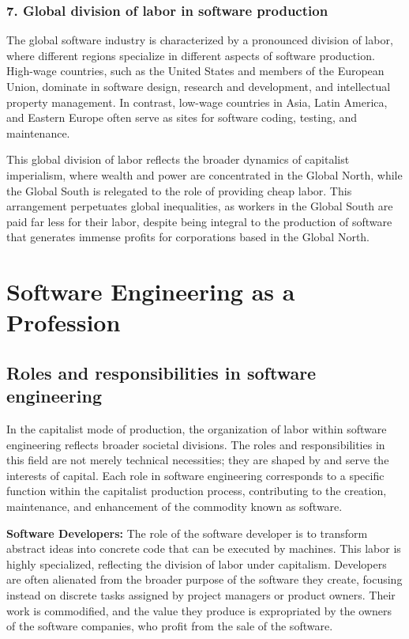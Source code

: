 \begin{refsection}
\begin{multicols}{2}
{\subsubsection*{7. Global division of labor in software production}

The global software industry is characterized by a pronounced division of labor, where different regions specialize in different aspects of software production. High-wage countries, such as the United States and members of the European Union, dominate in software design, research and development, and intellectual property management. In contrast, low-wage countries in Asia, Latin America, and Eastern Europe often serve as sites for software coding, testing, and maintenance.

This global division of labor reflects the broader dynamics of capitalist imperialism, where wealth and power are concentrated in the Global North, while the Global South is relegated to the role of providing cheap labor. This arrangement perpetuates global inequalities, as workers in the Global South are paid far less for their labor, despite being integral to the production of software that generates immense profits for corporations based in the Global North.
}

\end{multicols}

\newpage

\section{Software Engineering as a Profession}
\begin{multicols}{2}
\subsection{Roles and responsibilities in software engineering}
{\small
In the capitalist mode of production, the organization of labor within software engineering reflects broader societal divisions. The roles and responsibilities in this field are not merely technical necessities; they are shaped by and serve the interests of capital. Each role in software engineering corresponds to a specific function within the capitalist production process, contributing to the creation, maintenance, and enhancement of the commodity known as software.

\textbf{Software Developers:} The role of the software developer is to transform abstract ideas into concrete code that can be executed by machines. This labor is highly specialized, reflecting the division of labor under capitalism. Developers are often alienated from the broader purpose of the software they create, focusing instead on discrete tasks assigned by project managers or product owners. Their work is commodified, and the value they produce is expropriated by the owners of the software companies, who profit from the sale of the software.

}
\end{multicols}
\end{refsection}
